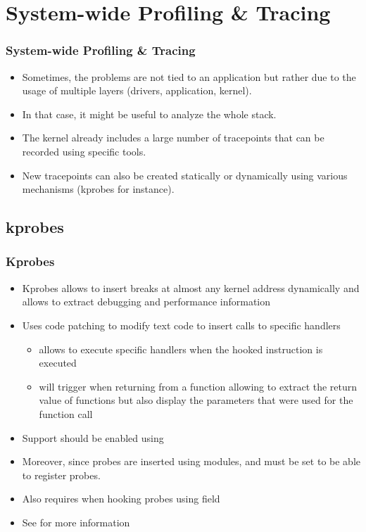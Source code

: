 \section{System-wide Profiling \& Tracing}

\begin{frame}
  \frametitle{System-wide Profiling \& Tracing}
  \begin{itemize}
    \item Sometimes, the problems are not tied to an application but rather
          due to the usage of multiple layers (drivers, application, kernel).
    \item In that case, it might be useful to analyze the whole stack.
    \item The kernel already includes a large number of tracepoints that can be
          recorded using specific tools.
    \item New tracepoints can also be created statically or dynamically using
          various mechanisms (kprobes for instance).
  \end{itemize}
\end{frame}

\subsection{kprobes}

\begin{frame}[fragile]
  \frametitle{Kprobes}
  \begin{itemize}
    \item {Kprobes} allows to insert breaks at almost any kernel address
          dynamically and allows to extract debugging and performance
          information
    \item Uses code patching to modify text code to insert calls to specific
          handlers
    \begin{itemize}
      \item {} allows to execute specific handlers when the hooked
            instruction is executed
      \item {} will trigger when returning from a function allowing to
            extract the return value of functions but also display the
            parameters that were used for the function call
    \end{itemize}
    \item Support should be enabled using 
    \item Moreover, since probes are inserted using modules, 
    and  must be set to be able to
    register probes.
    \item Also requires  when hooking probes
          using  field
    \item See  for more information
  \end{itemize}
\end{frame}

